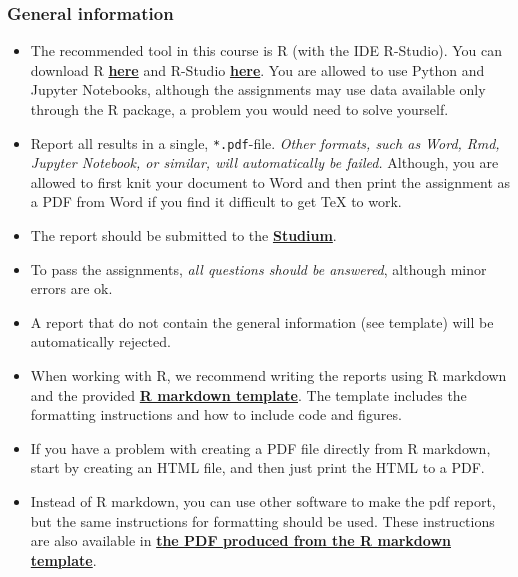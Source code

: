 
\subsubsection*{General information}


\begin{itemize}
\itemsep0em
\item The recommended tool in this course is R (with the IDE R-Studio). You can download R \href{https://cran.r-project.org/}{\textbf{here}} and R-Studio \href{https://www.rstudio.com/products/rstudio/download/}{\textbf{here}}. You are allowed to use Python and Jupyter Notebooks, although the assignments may use data available only through the R package, a problem you would need to solve yourself.

\item  Report all results in a single, \texttt{*.pdf}-file. \emph{Other formats, such as Word, Rmd, Jupyter Notebook, or similar, will automatically be failed.} Although, you are allowed to first knit your document to Word and then print the assignment as a PDF from Word if you find it difficult to get TeX to work.

\item The report should be submitted to the \href{https://studium.uu.se/}{\textbf{Studium}}.

\item To pass the assignments, \emph{all questions should be answered}, although minor errors are ok.

\item A report that do not contain the general information (see template) will be automatically rejected.

\item When working with R, we recommend writing the reports using R markdown and the provided \href{https://raw.githubusercontent.com/MansMeg/IntroML/master/templates/assignment_template.rmd}{\textbf{R markdown template}}. The template includes the formatting instructions and how to include code and figures.

\item If you have a problem with creating a PDF file directly from R markdown, start by creating an HTML file, and then just print the HTML to a PDF.

\item Instead of R markdown, you can use other software to make the pdf report, but the same instructions for formatting should be used. These instructions are also available in \href{https://raw.githubusercontent.com/MansMeg/IntroML/master/templates/assignment_template.pdf}{\textbf{the PDF produced from the R markdown template}}.


\end{itemize}
